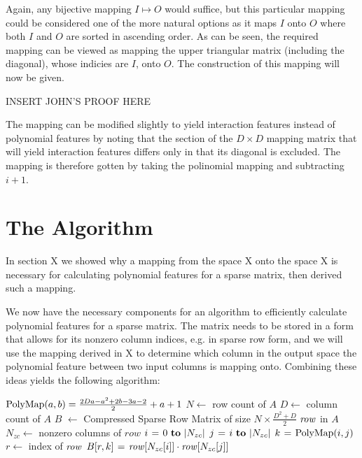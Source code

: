 \documentclass[11pt,onecolumn]{article}
\begin{document}
Again, any bijective mapping $I \mapsto O$ would suffice, but this particular mapping could
be considered one of the more natural options as it maps $I$ onto $O$ where both $I$ and $O$ are sorted in ascending order.
As can be seen, the required mapping can be viewed as mapping the upper triangular matrix (including 
the diagonal), whose indicies are $I$, onto $O$. The construction of this mapping will now
be given.

INSERT JOHN'S PROOF HERE

The mapping can be modified slightly to yield interaction features instead of polynomial features
by noting that the section of the $D \times D$ mapping matrix that will yield interaction
features differs only in that its diagonal is excluded. The mapping is therefore gotten by
taking the polinomial mapping and subtracting $i+1$.


\section{The Algorithm}
In section X we showed why a mapping from the space X
onto the space X is necessary for calculating polynomial features for a sparse matrix, then
derived such a mapping.

We now have the necessary components for an algorithm to efficiently calculate polynomial features for
a sparse matrix. The matrix needs to be stored in a form that allows for its nonzero column indices, e.g. in sparse row form,
and we will use the mapping derived in X to determine which column in the output space
the polynomial feature between two input columns is mapping onto. Combining these ideas yields the following algorithm:

\begin{codebox}
    \zi $\func{PolyMap}(a, b) = \frac{2Da-a^2+2b-3a-2}{2}+a+1$
    \zi $N \gets$ row count of $A$
    \zi $D \gets$ column count of $A$
    \zi $B$ $\gets$ Compressed Sparse Row Matrix of size $N \times \frac{D^2+D}{2}$
    \zi \For $\id{row}$ in $A$ \Do
    \zi     $N_{zc} \gets$ nonzero columns of $row$
    \zi     \For $i \gets 0 \To |N_{zc}|$ \Do
    \zi         \For $j \gets i \To |N_{zc}|$ \Do
    \zi             $k \gets \func{PolyMap}(i, j)$
    \zi             $r \gets$ index of $\id{row}$
    \zi             $B[r, k] \gets \id{row}[N_{zc}[i]] \cdot \id{row}[N_{zc}[j]]$
                \End
            \End
       	\End
\end{codebox}
\end{document}
